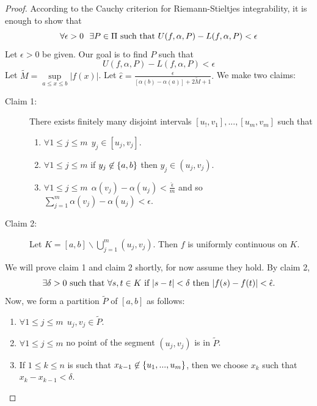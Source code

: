 \begin{proof}
    According to the Cauchy criterion for Riemann-Stieltjes integrability, it is enough to show that 
    $$\forall \epsilon > 0 ~~\exists P \in \Pi \text{ such that } U(f, \alpha, P) - L(f, \alpha, P) < \epsilon$$
    Let $\epsilon > 0$ be given. Our goal is to find $P$ such that 
    $$U(f, \alpha, P) - L(f, \alpha, P) < \epsilon$$
    Let $\tilde{M} = \sup \limits_{a \leq x \leq b} |f(x)|$. Let $\hat{\epsilon} = \frac{\epsilon}{[\alpha(b)-\alpha(a)] + 2\tilde{M}+1}.$ We make two claims:
    \begin{description}
        \item[Claim 1: ] There exists finitely many disjoint intervals $[u_!,v_1], ..., [u_m, v_m]$ such that 
        \begin{enumerate}
            \item $\forall 1 \leq j \leq m ~~y_j\in [u_j, v_j].$
            \item $\forall 1 \leq j \leq m $ if $y_j \not \in \left\{a,b\right\}$ then $y_j \in (u_j, v_j).$
            \item $\forall 1 \leq j \leq m ~~\alpha(v_j) - \alpha(u_j) < \frac{\hat{\epsilon}}{m}$ and so $\sum_{j=1}^m \alpha(v_j)-\alpha(u_j) < \epsilon.$
        \end{enumerate}

        \item[Claim 2: ] Let $K = [a,b] \backslash \bigcup_{j=1}^m (u_j, v_j).$ Then $f$ is uniformly continuous on $K$.
    \end{description}
    We will prove claim 1 and claim 2 shortly, for now assume they hold. By claim 2,
    $$\exists \delta > 0 \text{ such that } \forall s,t \in K \text{ if $|s-t|<\delta$ then $|f(s) - f(t)| < \hat{\epsilon}$.}$$
    Now, we form a partition $\tilde{P}$ of $[a,b]$ as follows:
    \begin{enumerate}
        \item $\forall 1 \leq j \leq m ~~u_j,v_j \in \tilde{P}$.
        \item $\forall 1 \leq j \leq m$ no point of the segment $(u_j, v_j)$ is in $\tilde{P}$.
        \item If $1 \leq k \leq n$ is such that $x_{k-1} \not \in \left\{u_1,..., u_m\right\}$, then we choose $x_k$ such that $x_k - x_{k-1} < \delta$.
    \end{enumerate}


\end{proof}
